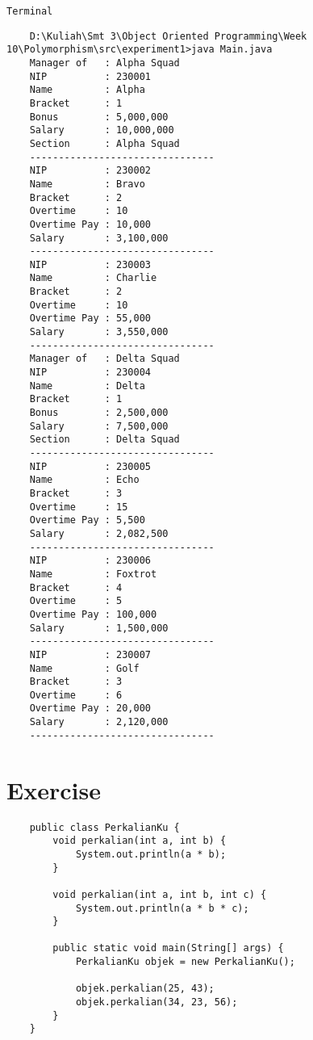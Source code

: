 \documentclass[12pt,titlepage]{article}
\begin{document}
\texttt{Terminal}
\begin{verbatim}
    D:\Kuliah\Smt 3\Object Oriented Programming\Week 10\Polymorphism\src\experiment1>java Main.java
    Manager of   : Alpha Squad
    NIP          : 230001
    Name         : Alpha
    Bracket      : 1
    Bonus        : 5,000,000
    Salary       : 10,000,000
    Section      : Alpha Squad
    --------------------------------
    NIP          : 230002
    Name         : Bravo
    Bracket      : 2
    Overtime     : 10
    Overtime Pay : 10,000
    Salary       : 3,100,000
    --------------------------------
    NIP          : 230003
    Name         : Charlie
    Bracket      : 2
    Overtime     : 10
    Overtime Pay : 55,000
    Salary       : 3,550,000
    --------------------------------
    Manager of   : Delta Squad
    NIP          : 230004
    Name         : Delta
    Bracket      : 1
    Bonus        : 2,500,000
    Salary       : 7,500,000
    Section      : Delta Squad
    --------------------------------
    NIP          : 230005
    Name         : Echo
    Bracket      : 3
    Overtime     : 15
    Overtime Pay : 5,500
    Salary       : 2,082,500
    --------------------------------
    NIP          : 230006
    Name         : Foxtrot
    Bracket      : 4
    Overtime     : 5
    Overtime Pay : 100,000
    Salary       : 1,500,000
    --------------------------------
    NIP          : 230007
    Name         : Golf
    Bracket      : 3
    Overtime     : 6
    Overtime Pay : 20,000
    Salary       : 2,120,000
    --------------------------------
\end{verbatim}

\newpage

\section{Exercise}
\begin{verbatim}
    public class PerkalianKu {
        void perkalian(int a, int b) {
            System.out.println(a * b);
        }

        void perkalian(int a, int b, int c) {
            System.out.println(a * b * c);
        }

        public static void main(String[] args) {
            PerkalianKu objek = new PerkalianKu();

            objek.perkalian(25, 43);
            objek.perkalian(34, 23, 56);
        }
    }
\end{verbatim}
\end{document}

